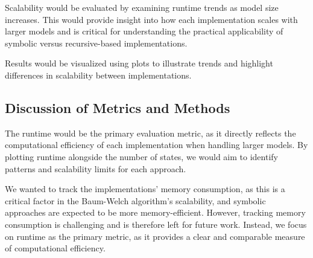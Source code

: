 Scalability would be evaluated by examining runtime trends as model size increases.
This would provide insight into how each implementation scales with larger models and is critical for understanding the practical applicability of symbolic versus recursive-based implementations.

Results would be visualized using plots to illustrate trends and highlight differences in scalability between implementations.

\subsection{Discussion of Metrics and Methods}
The runtime would be the primary evaluation metric, as it directly reflects the computational efficiency of each implementation when handling larger models. 
By plotting runtime alongside the number of states, we would aim to identify patterns and scalability limits for each approach.

We wanted to track the implementations' memory consumption, as this is a critical factor in the Baum-Welch algorithm's scalability, and symbolic approaches are expected to be more memory-efficient.
However, tracking memory consumption is challenging and is therefore left for future work.
Instead, we focus on runtime as the primary metric, as it provides a clear and comparable measure of computational efficiency.